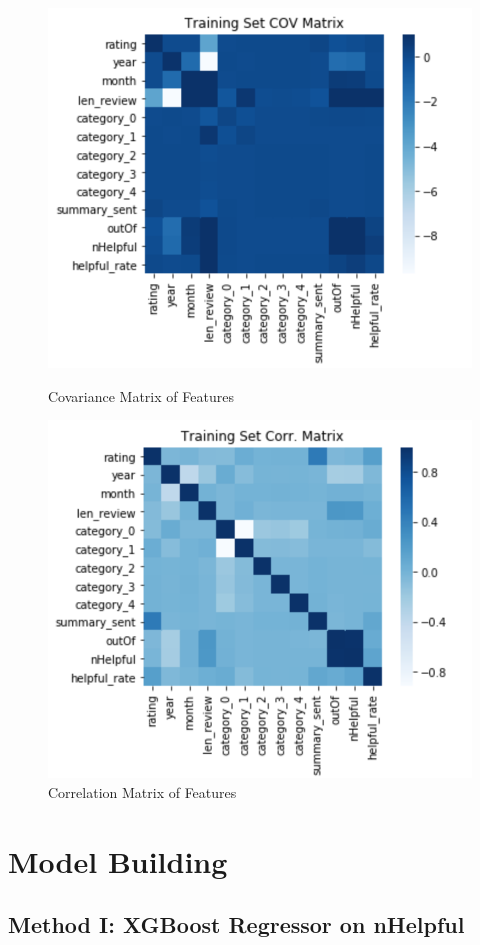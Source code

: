 \documentclass[12pt]{article}
\theoremstyle{plain}
\theoremstyle{definition}
\numberwithin{equation}{theorem}
\begin{document}
\begin{figure}[!htb]
   \begin{minipage}{0.48\textwidth}
     \centering
     \includegraphics[width=.7\linewidth]{cov_matrix}
     \caption{Covariance Matrix of Features}\label{Fig: COV Matrix}
   \end{minipage}\hfill
   \begin{minipage}{0.48\textwidth}
     \centering
     \includegraphics[width=.7\linewidth]{correlation_matrix}
     \caption{Correlation Matrix of Features}\label{Fig: Corr Matrix}
   \end{minipage}
\end{figure}
\bigskip
\bigskip

\section{Model Building}
\subsection{Method I: XGBoost Regressor on nHelpful}
\end{document}
